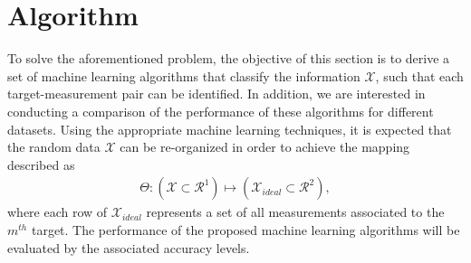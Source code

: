 \documentclass[letterpaper, 10 pt, conference]{ieeeconf}
\begin{document}


\section{Algorithm}\label{sec:alg}
To solve the aforementioned problem, the objective of this section is to derive a set of machine learning algorithms that classify the information $\mathcal{X}$, such that each target-measurement pair can be identified. In addition, we are interested in conducting a comparison of the performance of these algorithms for different datasets. Using the appropriate machine learning techniques, it is expected that the random data $\mathcal{X}$ can be re-organized in order to achieve the mapping described as
\begin{align}
\Theta:(\mathcal{X} \subset \mathcal{R}^1) \mapsto (\mathcal{X}_{ideal} \subset \mathcal{R}^2),\label{eq:mapping}
\end{align}
where each row of $\mathcal{X}_{ideal}$ represents a set of all measurements associated to the $m^{th}$ target. The performance of the proposed machine learning algorithms will be evaluated by the associated accuracy levels. 

\end{document}
